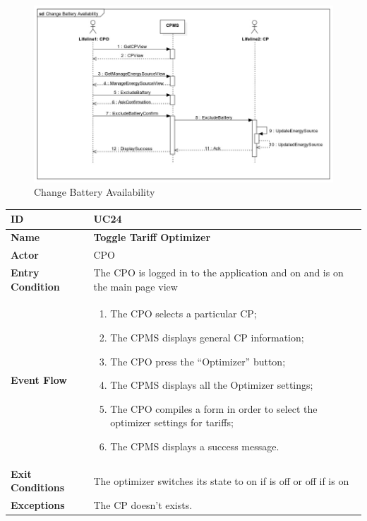 \documentclass{Configuration_Files/PoliMi3i_thesis}
\begin{document}
\begin{figure}[H]
    \centering
    \includegraphics[width=1\textwidth]{Images/UseCases/Change Battery Availability.jpg}
    \caption{Change Battery Availability}
\end{figure}


\newpage\begin{table}[H]
    \begin{xltabular}{\textwidth}{| >{}l | X |}
    \hline
    \textbf{ID} & \textbf{UC24}\T\B\\
    \hline
    \textbf{Name} & \textbf{Toggle Tariff Optimizer}\T\B\\
    \hline \hline
    \textbf{Actor} & CPO\T\B \\
    \hline
    \textbf{Entry Condition} & The CPO is logged in to the application and on and is on the main page view\T\B\\
    \hline
    \textbf{Event Flow} & 
        \begin{enumerate}
        \item The CPO selects a particular CP;
        \item The CPMS displays general CP information;
        \item The CPO press the “Optimizer” button;
        \item The CPMS displays all the Optimizer settings;
        \item The CPO compiles a form in order to select the optimizer settings for tariffs;
        \item The CPMS displays a success message.
        \end{enumerate}\B\\
    \hline
    \textbf{Exit Conditions} & The optimizer switches its state to on if is off or off if is on \B\\
    \hline
    \textbf{Exceptions} & The CP doesn't exists.\B\\
    \hline
    \end{xltabular}
\end{table}
\end{document}
